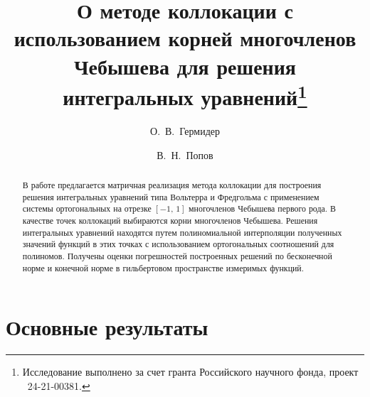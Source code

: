 \usepackage{todonotes}

\usepackage[russian]{nla}


\fi

\title{О методе коллокации с использованием корней многочленов Чебышева для решения интегральных уравнений\thanks{Исследование выполнено за счет гранта Российского научного фонда, проект \textnumero~24-21-00381.}}
\author{О.~В.~Гермидер \and  В.~Н.~Попов
}


\maketitle

\begin{abstract}

В работе предлагается матричная реализация метода коллокации для построения решения интегральных уравнений типа Вольтерра и Фредгольма с применением системы ортогональных на отрезке $[-1,\,1]$ многочленов Чебышева первого рода. В качестве точек коллокаций выбираются корни многочленов Чебышева. Решения интегральных уравнений находятся путем полиномиальной интерполяции полученных значений функций в этих точках с использованием ортогональных соотношений для полиномов. Получены оценки погрешностей построенных решений по бесконечной норме и конечной норме в гильбертовом пространстве измеримых функций.

\end{abstract}

\section{Основные результаты} %


